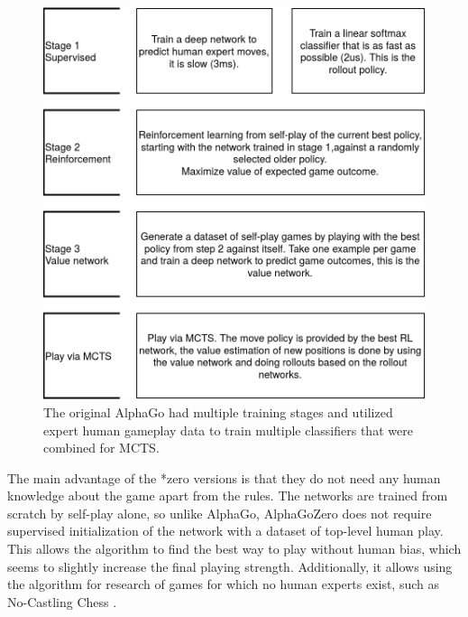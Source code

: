\documentclass[12pt,onecolumn,oneside,titlepage]{article}
\begin{document}
\begin{figure}[H]
\centering
\includegraphics[clip,width=0.8\columnwidth]{alphago}
\caption{The original AlphaGo had multiple training stages and utilized expert human gameplay data to train multiple classifiers that were combined for MCTS.}
\label{fig:alphago_overview}
\end{figure}

The main advantage of the *zero versions is that they do not need any human knowledge about the game apart from the rules.
The networks are trained from scratch by self-play alone, so unlike AlphaGo, AlphaGoZero does not require supervised initialization 
of the network with a dataset of top-level human play. This allows the algorithm to find the best way to play without human bias, which seems to slightly increase the final playing strength.
Additionally, it allows using the algorithm for research of games for which no human experts exist, such as No-Castling Chess \cite{NoCastleChess}.
\end{document}
